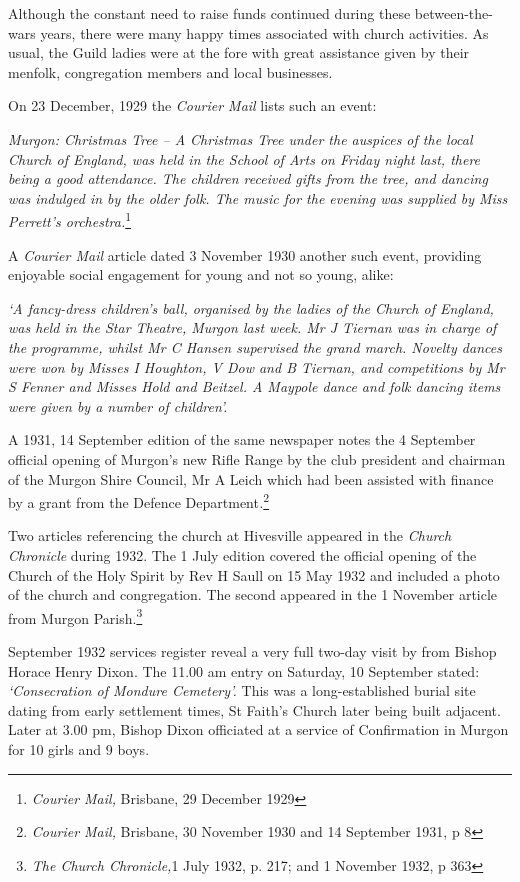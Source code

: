 Although the constant need to raise funds continued during these between-the-wars years, there were many happy times associated with church activities. As usual, the Guild ladies were at the fore with great assistance given by their menfolk, congregation members and local businesses.



On 23 December, 1929 the \emph{Courier Mail} lists such an event:



\emph{Murgon: Christmas Tree -- A Christmas Tree under the auspices of the local Church of England, was held in the School of Arts on Friday night last, there being a good attendance. The children received gifts from the tree, and dancing was indulged in by the older folk. The music for the evening was supplied by Miss Perrett's orchestra.}\footnote{\emph{Courier Mail,} Brisbane, 29 December 1929}


A \emph{Courier Mail} article dated 3 November 1930 another such event, providing enjoyable social engagement for young and not so young, alike:



\emph{`A fancy-dress children's ball, organised by the ladies of the Church of England, was held in the Star Theatre, Murgon last week. Mr J Tiernan was in charge of the programme, whilst Mr C Hansen supervised the grand march. Novelty dances were won by Misses I Houghton, V Dow and B Tiernan, and competitions by Mr S Fenner and Misses Hold and Beitzel. A Maypole dance and folk dancing items were given by a number of children'.}



A 1931, 14 September edition of the same newspaper notes the 4 September official opening of Murgon's new Rifle Range by the club president and chairman of the Murgon Shire Council, Mr A Leich which had been assisted with finance by a grant from the Defence Department\emph{.}\footnote{\emph{Courier Mail,} Brisbane, 30 November 1930 and 14 September 1931, p 8}


Two articles referencing the church at Hivesville appeared in the \emph{Church Chronicle} during 1932. The 1 July edition covered the official opening of the Church of the Holy Spirit by Rev H Saull on 15 May 1932 and included a photo of the church and congregation. The second appeared in the 1 November article from Murgon Parish.\footnote{\emph{The Church Chronicle,}1 July 1932, p. 217; and 1 November 1932, p 363}


September 1932 services register reveal a very full two-day visit by from Bishop Horace Henry Dixon. The 11.00 am entry on Saturday, 10 September stated: \emph{`Consecration of Mondure Cemetery'.} This was a long-established burial site dating from early settlement times, St Faith's Church later being built adjacent. Later at 3.00 pm, Bishop Dixon officiated at a service of Confirmation in Murgon for 10 girls and 9 boys.



